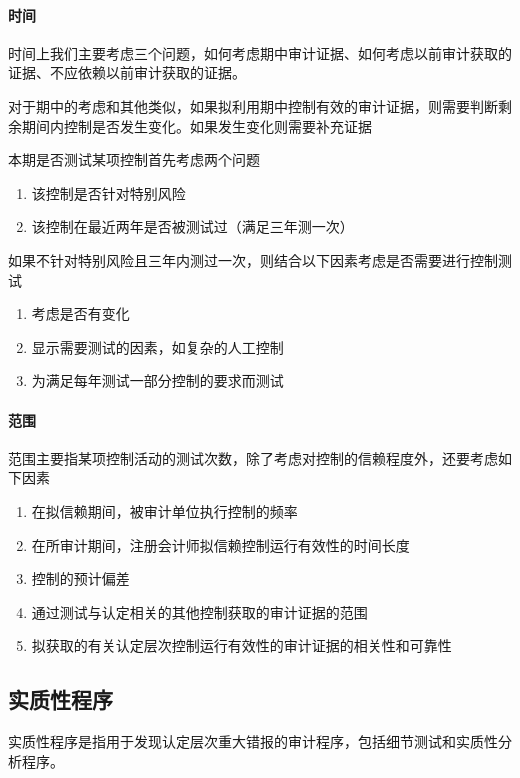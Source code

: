 \documentclass[UTF8,12pt]{ctexart}
\numberwithin{equation}{section} %
\numberwithin{figure}{section}
\numberwithin{table}{section}
\begin{document}
	\paragraph{时间}
	时间上我们主要考虑三个问题，如何考虑期中审计证据、如何考虑以前审计获取的证据、不应依赖以前审计获取的证据。
	
	对于期中的考虑和其他类似，如果拟利用期中控制有效的审计证据，则需要判断剩余期间内控制是否发生变化。如果发生变化则需要补充证据
	
	本期是否测试某项控制首先考虑两个问题
	\begin{enumerate}
		\item 该控制是否针对特别风险
		
		\item 该控制在最近两年是否被测试过（满足三年测一次）
	\end{enumerate}
	
	如果不针对特别风险且三年内测过一次，则结合以下因素考虑是否需要进行控制测试
	\begin{enumerate}
		\item 考虑是否有变化
		
		\item 显示需要测试的因素，如复杂的人工控制
		
		\item 为满足每年测试一部分控制的要求而测试
	\end{enumerate}
	
	
	
	\paragraph{范围}
	范围主要指某项控制活动的测试次数，除了考虑对控制的信赖程度外，还要考虑如下因素
	\begin{enumerate}
		\item 在拟信赖期间，被审计单位执行控制的频率
		
		\item 在所审计期间，注册会计师拟信赖控制运行有效性的时间长度
		
		\item 控制的预计偏差
		
		\item 通过测试与认定相关的其他控制获取的审计证据的范围
		
		\item 拟获取的有关认定层次控制运行有效性的审计证据的相关性和可靠性
	\end{enumerate}
	
	\subsection{实质性程序}
	实质性程序是指用于发现认定层次重大错报的审计程序，包括细节测试和实质性分析程序。
	
\end{document}

